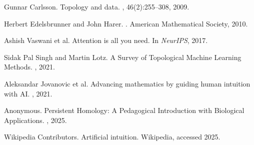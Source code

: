 \documentclass[11pt]{article}
\begin{document}

\begin{thebibliography}{10}

Gunnar Carlsson.
\newblock Topology and data.
, 46(2):255--308, 2009.

Herbert Edelsbrunner and John Harer.
.
\newblock American Mathematical Society, 2010.

Ashish Vaswani et al.
\newblock Attention is all you need.
\newblock In {\em NeurIPS}, 2017.

Sidak Pal Singh and Martin Lotz.
\newblock A Survey of Topological Machine Learning Methods.
, 2021.

Aleksandar Jovanovic et al.
\newblock Advancing mathematics by guiding human intuition with AI.
, 2021.

Anonymous.
\newblock Persistent Homology: A Pedagogical Introduction with Biological Applications.
, 2025.

Wikipedia Contributors.
\newblock Artificial intuition.
\newblock Wikipedia, accessed 2025.

\end{thebibliography}
\end{document}
